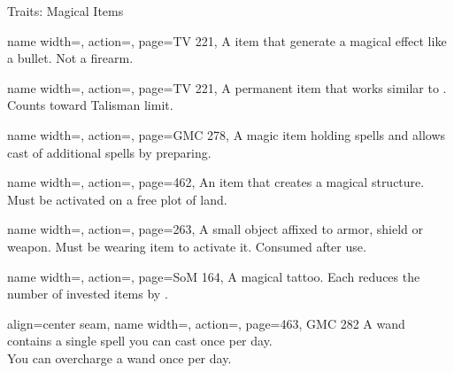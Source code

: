 \begin{PageBackLandscape}
\begin{TablesHalf}{\backTableHeight}
\begin{Table}{Traits: Magical Items}
\begin{entry}{}{%
                name width=\conditionLength,%
                action=\Spellgun,
                page=TV 221,
            }
                A item that generate a magical effect like a bullet. Not a firearm.
            \end{entry}
            \begin{entry}{}{%
                name width=\conditionLength,%
                action=\Spellheart,
                page=TV 221,
            }
                A permanent item that works similar to .
                Counts toward Talisman limit. \hfill
            \end{entry}
            \begin{entry}{}{%
                name width=\conditionLength,%
                action=\Staff,
                page=GMC 278,
            }
                A magic item holding spells and allows cast of additional spells by preparing.
            \end{entry}
            \begin{entry}{}{%
                name width=\conditionLength,%
                action=\Structure,
                page=462,
            }
                An item that creates a magical structure. Must be activated on a free plot of land.
            \end{entry}
            \begin{entry}{}{%
                name width=\conditionLength,%
                action=\Talisman,
                page=263,
            }
                A small object affixed to armor, shield or weapon.
                Must be wearing item to activate it.
                Consumed after use.
            \end{entry}
            \begin{entry}{}{%
                name width=\conditionLength,%
                action=\Tattoo,
                page=SoM 164,
            }
                A magical tattoo.
                Each reduces the number of invested items by .
            \end{entry}
            \begin{entry}{}{%
                align=center seam,
                name width=\conditionLength,%
                action=\Wand,
                page={463, GMC 282}
            }
                A wand contains a single spell you can cast once per day. \\
                You can overcharge a wand once per day.
                \Flat[][val=5]  \hfill
            \end{entry}
        \end{Table}
    \end{TablesHalf}%
\end{PageBackLandscape}